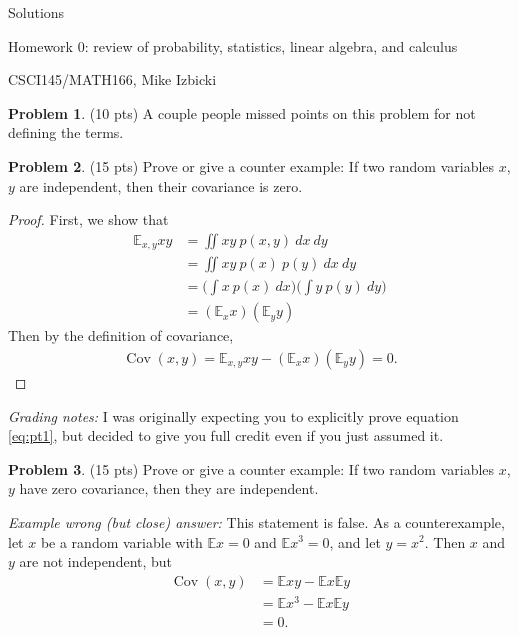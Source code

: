 \documentclass[10pt]{article}
\theoremstyle{definition}
\newtheorem{problem}{Problem}
\newcommand{\E}{\mathbb E}
\DeclareMathOperator{\Cov}{Cov}
\begin{document}
\begin{center}
    {
\Large
Solutions

    \vspace{0.2in}
Homework 0: review of probability, statistics, linear algebra, and calculus
}

    \vspace{0.1in}
CSCI145/MATH166, Mike Izbicki

    \vspace{0.1in}
\end{center}

\begin{problem}
    (10 pts)
    A couple people missed points on this problem for not defining the terms.
\end{problem}

\begin{problem}
    (15 pts)
    Prove or give a counter example:
    If two random variables $x$,$y$ are independent, then their covariance is zero.
\end{problem}
\begin{proof}
    First, we show that %
    \begin{align}
        \E_{x,y} xy 
        &= \iint xy~p(x,y)~dx~dy \\
        &= \iint xy~p(x)~p(y)~dx~dy \\
        &= \bigg(\int x~p(x)~dx\bigg) \bigg(\int y~p(y)~dy \bigg) \\
        &= (\E_x x)(\E_y y)
        \label{eq:pt1}
    \end{align}
    Then by the definition of covariance,
    \begin{align}
        \Cov(x,y) = \E_{x,y} xy - (\E_x x)(\E_y y) = 0.
    \end{align}
\end{proof}

\noindent
\textit{Grading notes:} 
I was originally expecting you to explicitly prove equation \eqref{eq:pt1},
but decided to give you full credit even if you just assumed it.

\begin{problem}
    (15 pts)
    Prove or give a counter example:
    If two random variables $x$,$y$ have zero covariance, then they are independent.
\end{problem}

\noindent
\textit{Example wrong (but close) answer:}
This statement is false.
As a counterexample, let $x$ be a random variable with $\E x = 0$ and $\E x^3 = 0$,
and let $y=x^2$.
Then $x$ and $y$ are not independent, but
\begin{align}
    \Cov(x,y)
    &= \E xy - \E x \E y \\
    &= \E x^3 - \E x \E y \\
    &= 0.
\end{align}
\end{document}
